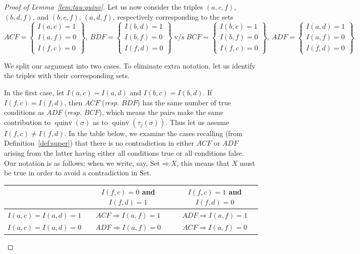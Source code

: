 \documentclass[ALCO,Unicode]{cedram}
\DeclareMathOperator{\quinv}{quinv}
\begin{document}
\begin{proof}[Proof of Lemma~\ref{lem:tau:quinv}]
Let us now consider the triples $(a,c,f)$, $(b,d,f)$, and $(b,c,f)$, $(a,d,f)$, respectively corresponding to the sets
{\scriptsize 
\[ 
ACF = \left\{\begin{matrix}I(a,c)=1\\I(a,f)=0\\I(f,c)=0 \end{matrix} \right\},\  
BDF = \left\{\begin{matrix}I(b,d)=1\\I(b,f)=0\\I(f,d)=0 \end{matrix} \right\} 
\; \mbox{v/s} \;
BCF = \left\{\begin{matrix}I(b,c)=1\\I(b,f)=0\\I(f,c)=0 \end{matrix} \right\},\ 
ADF = \left\{\begin{matrix}I(a,d)=1\\I(a,f)=0\\I(f,d)=0 \end{matrix} \right\}.
\]
}

We split our argument into two cases. To eliminate extra notation, let us identify the triples with their corresponding sets. 

In the first case, let $I(a,c)=I(a,d)$ and $I(b,c)=I(b,d)$. If $I(f,c)=I(f,d)$, then $ACF$ (\emph{resp.} $BDF$) has the same number of true conditions as $ADF$ (\emph{resp.} $BCF$), which means the pairs make the same contribution to $\quinv(\sigma)$ as to $\quinv(\tau_j(\sigma))$. Thus let us assume $I(f,c)\neq I(f,d)$. In the table below, we examine the cases recalling (from Definition~\ref{def:super}) that there is no contradiction in either $ACF$ or $ADF$ arising from the latter having either all conditions true or all conditions false. 
Our notation is as follows: when we write, say, $\text{Set} \Rightarrow X$, this means that $X$ must be true in order to avoid a contradiction in $\text{Set}$.


\begin{center}
{\renewcommand{\arraystretch}{1.2}
\flushleft
\footnotesize
\begin{tabular}{l|c|c|}
& $I(f,c)=0$ and $I(f,d)=1$ & $I(f,c)=1$ and $I(f,d)=0$\\ \hline
$I(a,c)=I(a,d)=1$ & $ACF \Rightarrow I(a,f)=1$ & $ADF \Rightarrow I(a,f)=1$ \\ \hline
$I(a,c)=I(a,d)=0$ & $ADF \Rightarrow I(a,f)=0$ & $ACF \Rightarrow I(a,f)=0$\\ \hline


\end{tabular}}
\end{center}
\end{proof}
\end{document}
